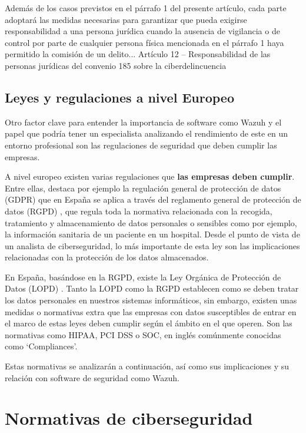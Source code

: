 \begin{tcolorbox}[coltitle=blue!50!black,colframe=blue!25,title=Artículo 197 bis]
 Además de los casos previstos en el párrafo 1 del presente artículo, cada parte
adoptará las medidas necesarias para garantizar que pueda exigirse responsabilidad
a una persona jurídica cuando la ausencia de vigilancia o de control por parte de
cualquier persona física mencionada en el párrafo 1 haya permitido la comisión de un
delito...
\tcblower
Artículo 12 – Responsabilidad de las personas jurídicas del convenio 185 sobre la ciberdelincuencia \cite{t108}
\end{tcolorbox}


\subsection{Leyes y regulaciones a nivel Europeo}

Otro factor clave para entender la importancia de software como Wazuh y el papel que podría tener un especialista analizando el rendimiento de este en un entorno profesional son las regulaciones de seguridad que deben cumplir las empresas.

A nivel europeo existen varias regulaciones que \textbf{las empresas deben cumplir}. Entre ellas, destaca por ejemplo la regulación general de protección de datos (GDPR) que en España se aplica a través del reglamento general de protección de datos (RGPD) \cite{rgpd}, que regula toda la normativa relacionada con la recogida, tratamiento y almacenamiento de datos personales o sensibles como por ejemplo, la información sanitaria de un paciente en un hospital. 
Desde el punto de vista de un analista de ciberseguridad, lo más importante de esta ley son las implicaciones relacionadas con la protección de los datos almacenados. 

En España, basándose en la RGPD, existe la Ley Orgánica de Protección de Datos (LOPD) \cite{lopd}. Tanto la LOPD como la RGPD establecen como se deben tratar los datos personales en nuestros sistemas informáticos, sin embargo, existen unas medidas o normativas extra que las empresas con datos susceptibles de entrar en el marco de estas leyes deben cumplir según el ámbito en el que operen. Son las normativas como HIPAA, PCI DSS o SOC, en inglés comúnmente conocidas como `Compliances'.

Estas normativas se analizarán a continuación, así como sus implicaciones y su relación con software de seguridad como Wazuh.

\section{Normativas de ciberseguridad}

